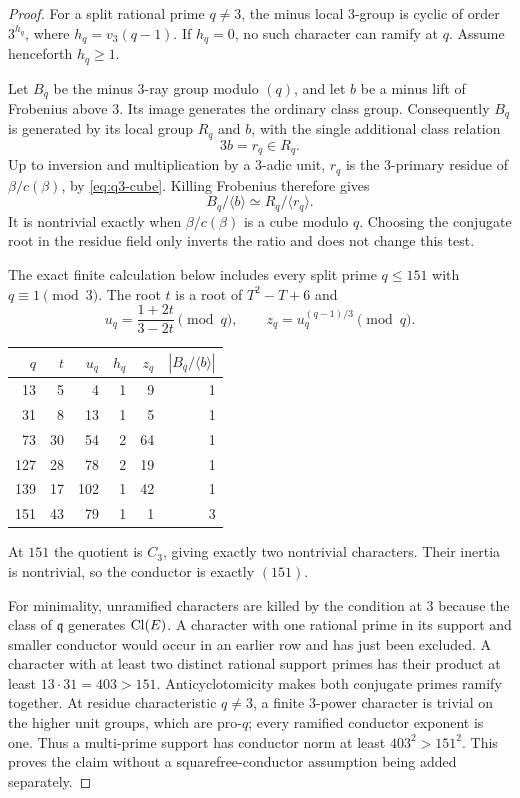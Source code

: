 \begin{proof}
For a split rational prime $q\ne3$, the minus local $3$-group is cyclic of order $3^{h_q}$, where $h_q=v_3(q-1)$. If $h_q=0$, no such character can ramify at $q$. Assume henceforth $h_q\ge1$.

Let $B_q$ be the minus $3$-ray group modulo $(q)$, and let $b$ be a minus lift of Frobenius above $3$. Its image generates the ordinary class group. Consequently $B_q$ is generated by its local group $R_q$ and $b$, with the single additional class relation
\[
                         3b=r_q\in R_q.
\]
Up to inversion and multiplication by a $3$-adic unit, $r_q$ is the $3$-primary residue of $\beta/c(\beta)$, by \eqref{eq:q3-cube}. Killing Frobenius therefore gives
\begin{equation}\label{eq:ray-quotient}
                 B_q/\langle b\rangle
                    \simeq R_q/\langle r_q\rangle.
\end{equation}
It is nontrivial exactly when $\beta/c(\beta)$ is a cube modulo $q$. Choosing the conjugate root in the residue field only inverts the ratio and does not change this test.

The exact finite calculation below includes every split prime $q\le151$ with $q\equiv1\pmod3$. The root $t$ is a root of $T^2-T+6$ and
\[
        u_q=\frac{1+2t}{3-2t}\pmod q,\qquad
        z_q=u_q^{(q-1)/3}\pmod q.
\]
\begin{center}
\begin{tabular}{rrrrrr}
\toprule
$q$ & $t$ & $u_q$ & $h_q$ & $z_q$ & $|B_q/\langle b\rangle|$\\
\midrule
13  &5 &4  &1&9 &1\\
31  &8 &13 &1&5 &1\\
73  &30&54 &2&64&1\\
127 &28&78 &2&19&1\\
139 &17&102&1&42&1\\
151 &43&79 &1&1 &3\\
\bottomrule
\end{tabular}
\end{center}
At $151$ the quotient is $C_3$, giving exactly two nontrivial characters. Their inertia is nontrivial, so the conductor is exactly $(151)$.

For minimality, unramified characters are killed by the condition at $3$ because the class of $\mathfrak q$ generates $\operatorname{Cl}(E)$. A character with one rational prime in its support and smaller conductor would occur in an earlier row and has just been excluded. A character with at least two distinct rational support primes has their product at least $13\cdot31=403>151$. Anticyclotomicity makes both conjugate primes ramify together. At residue characteristic $q\ne3$, a finite $3$-power character is trivial on the higher unit groups, which are pro-$q$; every ramified conductor exponent is one. Thus a multi-prime support has conductor norm at least $403^2>151^2$. This proves the claim without a squarefree-conductor assumption being added separately.
\end{proof}


